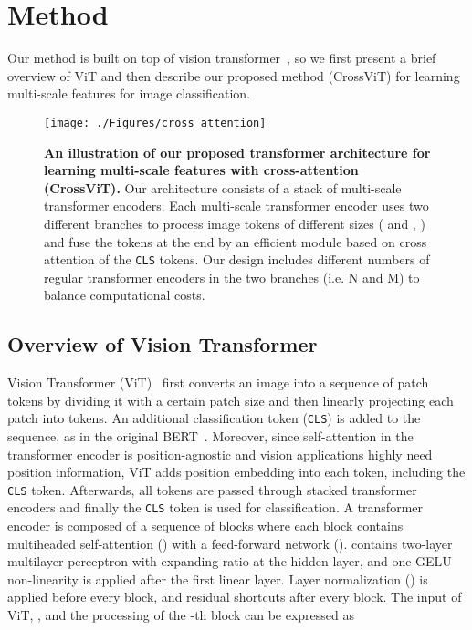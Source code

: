 \documentclass[10pt,twocolumn,letterpaper]{article}
\def\clstoken{\texttt{CLS}\xspace}
\def\ours{CrossViT\xspace}
\begin{document}
 \section{Method}
\label{sec:proposed}
Our method is built on top of vision transformer~\cite{ViT_dosovitskiy2021an}, so we first present a brief overview of ViT and then describe our proposed method (\ours) for learning multi-scale features for image classification.

\begin{figure}[tb!]
    \centering
    \texttt{[image: ./Figures/cross\_attention]}
    \caption{\textbf{An illustration of our proposed transformer architecture for learning multi-scale features with cross-attention (\ours).} Our architecture consists of a stack of  multi-scale transformer encoders. Each multi-scale transformer encoder uses two different branches to process image tokens of different sizes ( and , ) and fuse the tokens at the end by an efficient module based on cross attention of the \clstoken tokens. Our design includes different numbers of regular transformer encoders in the two branches (i.e. N and M) to balance computational costs. 
    }
    \label{fig:cross_attention} 
\end{figure}

\subsection{Overview of Vision Transformer}

Vision Transformer (ViT)~\cite{ViT_dosovitskiy2021an} first converts an image into a sequence of patch tokens by dividing it with a certain patch size and then linearly projecting each patch into tokens.  An additional classification token (\clstoken) is added to the sequence, as in the original BERT~\cite{devlin2018bert}.
Moreover, since self-attention in the transformer encoder is position-agnostic and vision applications highly need position information, ViT adds position embedding into each token, including the \clstoken token. Afterwards, all tokens are passed through stacked transformer encoders and finally the \clstoken token is used for classification. A transformer encoder is composed of a sequence of blocks where each block contains multiheaded self-attention () with a feed-forward network (). 
 contains two-layer multilayer perceptron with expanding ratio  at the hidden layer, and one GELU non-linearity is applied after the first linear layer.
Layer normalization () is applied before every block, and residual shortcuts after every block. 
The input of ViT, , and the processing of the -th block can be expressed as
\end{document}
